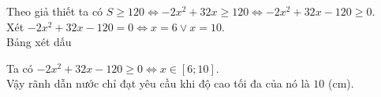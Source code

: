 \begin{bt}
{		Theo giả thiết ta có $S \ge 120 \Leftrightarrow - 2x^2 + 32x \ge 120 \Leftrightarrow -2x^2 + 32x - 120 \ge 0$. \\
		Xét $-2x^2 + 32x - 120 = 0 \Leftrightarrow x = 6 \vee x=10$. \\
		Bảng xét dấu
		\begin{center}
		\end{center}
		Ta có $-2x^2+32x-120 \ge 0 \Leftrightarrow x \in [6;10]$. \\
		Vậy rãnh dẫn nước chỉ đạt yêu cầu khi độ cao tối đa của nó là $10$ (cm).
	}
\end{bt}

